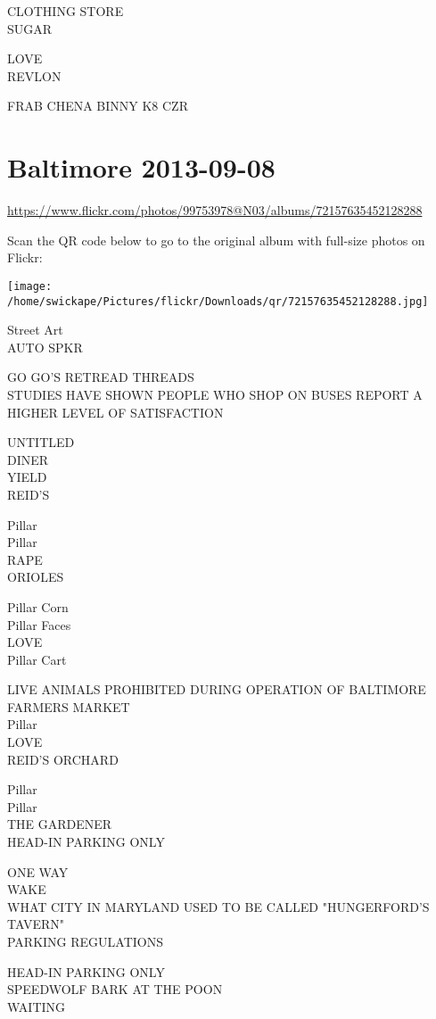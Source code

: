 \documentclass[10pt,letterpaper]{article}
\begin{document}
CLOTHING STORE\\
SUGAR

LOVE\\
REVLON

FRAB CHENA BINNY K8 CZR
\pagebreak

\section*{Baltimore 2013-09-08}

\url{https://www.flickr.com/photos/99753978@N03/albums/72157635452128288}

Scan the QR code below to go to the original album with full-size photos on Flickr:

\texttt{[image: /home/swickape/Pictures/flickr/Downloads/qr/72157635452128288.jpg]}
\pagebreak

Street Art\\
AUTO SPKR

GO GO'S RETREAD THREADS\\
STUDIES HAVE SHOWN PEOPLE WHO SHOP ON BUSES REPORT A HIGHER LEVEL OF SATISFACTION

UNTITLED\\
DINER\\
YIELD\\
REID'S

Pillar\\
Pillar\\
RAPE\\
ORIOLES

Pillar Corn\\
Pillar Faces\\
LOVE\\
Pillar Cart

LIVE ANIMALS PROHIBITED DURING OPERATION OF BALTIMORE FARMERS MARKET\\
Pillar\\
LOVE\\
REID'S ORCHARD

Pillar\\
Pillar\\
THE GARDENER\\
HEAD{-}IN PARKING ONLY

ONE WAY\\
WAKE\\
WHAT CITY IN MARYLAND USED TO BE CALLED "HUNGERFORD'S TAVERN"\\
PARKING REGULATIONS

HEAD{-}IN PARKING ONLY\\
SPEEDWOLF BARK AT THE POON\\
WAITING
\end{document}
